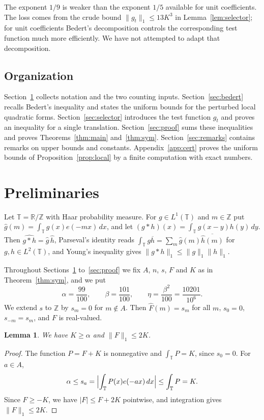 \documentclass{amsart}
\newtheorem{lemma}[theorem]{Lemma}
\theoremstyle{remark}
\numberwithin{equation}{section}
\numberwithin{table}{section}
\newcommand{\T}{\mathbb{T}}
\newcommand{\Z}{\mathbb{Z}}
\newcommand{\R}{\mathbb{R}}
\begin{document}
The exponent $1/9$ is weaker than the exponent $1/5$ available for unit coefficients. The loss comes from the crude bound $\|g_t\|_1\le13K^3$ in Lemma~\ref{lem:selector}; for unit coefficients Bedert's decomposition \cite[Lemma~7.1]{Bed} controls the corresponding test function much more efficiently. We have not attempted to adapt that decomposition.

\subsection*{Organization}
Section~\ref{sec:prelim} collects notation and the two counting inputs. Section~\ref{sec:bedert} recalls Bedert's inequality and states the uniform bounds for the perturbed local quadratic forms. Section~\ref{sec:selector} introduces the test function $g_t$ and proves an inequality for a single translation. Section~\ref{sec:proof} sums these inequalities and proves Theorems~\ref{thm:main} and~\ref{thm:sym}. Section~\ref{sec:remarks} contains remarks on upper bounds and constants. Appendix~\ref{app:cert} proves the uniform bounds of Proposition~\ref{prop:local} by a finite computation with exact numbers.

\section{Preliminaries}\label{sec:prelim}

Let $\T=\R/\Z$ with Haar probability measure. For $g\in L^1(\T)$ and $m\in\Z$ put $\widehat g(m)=\int_\T g(x)e(-mx)\,dx$, and let $(g*h)(x)=\int_\T g(x-y)h(y)\,dy$. Then $\widehat{g*h}=\widehat g\,\widehat h$, Parseval's identity reads $\int_\T g\overline h=\sum_m\widehat g(m)\overline{\widehat h(m)}$ for $g,h\in L^2(\T)$, and Young's inequality gives $\|g*h\|_1\le\|g\|_1\|h\|_1$.

Throughout Sections~\ref{sec:prelim} to~\ref{sec:proof} we fix $A$, $n$, $s$, $F$ and $K$ as in Theorem~\ref{thm:sym}, and we put
\[
\alpha=\frac{99}{100},\qquad\beta=\frac{101}{100},\qquad\eta=\frac{\beta^2}{100}=\frac{10201}{10^6}.
\]
We extend $s$ to $\Z$ by $s_m=0$ for $m\notin A$. Then $\widehat F(m)=s_m$ for all $m$, $s_0=0$, $s_{-m}=s_m$, and $F$ is real-valued.

\begin{lemma}\label{lem:basic}
We have $K\ge\alpha$ and $\|F\|_1\le2K$.
\end{lemma}

\begin{proof}
The function $P=F+K$ is nonnegative and $\int_\T P=K$, since $s_0=0$. For $a\in A$,
\[
\alpha\le s_a=\Bigl|\int_\T P(x)e(-ax)\,dx\Bigr|\le\int_\T P=K.
\]
Since $F\ge-K$, we have $|F|\le F+2K$ pointwise, and integration gives $\|F\|_1\le2K$.
\end{proof}
\end{document}
